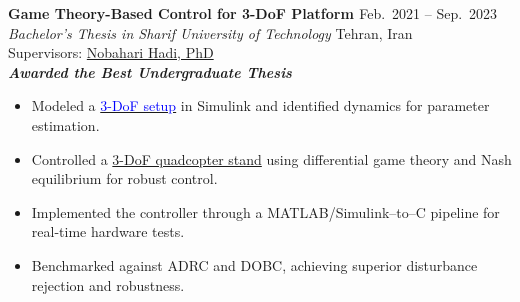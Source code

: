 \documentclass[12pt]{article}
\begin{document}
\noindent
{\bfseries Game Theory-Based Control for 3-DoF Platform
\href{https://github.com/alibaniasad1999/bachelor-thesis}{\faGithub}
\textcolor{red}{
\href{https://youtu.be/SXZACxGaE1A?si=61yCRB8jFIZlldFG}{\faYoutube}}
} \hfill Feb.\ 2021 -- Sep.\ 2023 \\[2pt]
\noindent \textit{Bachelor's Thesis in Sharif University of Technology} \hfill Tehran, Iran \\[2pt]
\noindent Supervisors:
\href{https://ae.sharif.edu/~portal/faculty/1091235256}{Nobahari Hadi, PhD} \\[2pt]
{\footnotesize \textbf{\textit{Awarded the Best Undergraduate Thesis \faMedal}}}
\vspace{-4pt}
\begin{itemize}  \itemsep 1pt %
    \item Modeled a \href{https://gcrc.sharif.edu/استند-آزمایشگاهی-کنترل-وضعیت-سه-درجه-آ/}{\textcolor{blue}{3-DoF setup}} in Simulink and identified dynamics for parameter estimation.
    \item Controlled a \href{https://gcrc.sharif.edu/استند-آزمایشگاهی-کنترل-وضعیت-سه-درجه-آ/}{{3-DoF quadcopter stand}} using {differential game} theory and {Nash equilibrium} for robust control.
    \item Implemented the controller through a MATLAB/Simulink–to–C pipeline for real-time hardware tests.
    \item Benchmarked against {ADRC} and {DOBC}, achieving superior disturbance rejection and robustness.

\end{itemize}
\end{document}
